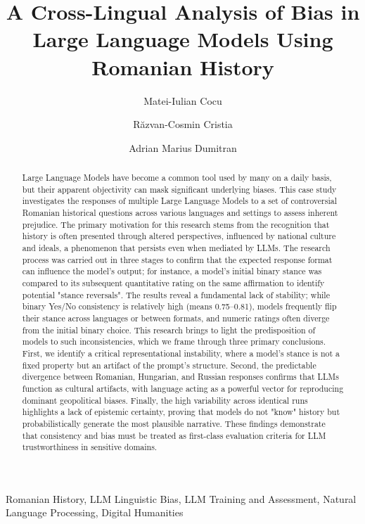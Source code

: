 \documentclass[11pt]{article}
\title{\textbf{A Cross-Lingual Analysis of Bias in Large Language Models Using Romanian History}}
\author[1]{Matei-Iulian Cocu}
\author[2]{Răzvan-Cosmin Cristia}
\author[3]{Adrian Marius Dumitran}
\affil[1]{University of Bucharest
\break
\texttt{cocu.matei24@yahoo.com}}
\affil[2]{University of Bucharest
 \break
\texttt{cristiarazvan@gmail.com}}
\affil[3]{University of Bucharest, Softbinator
 \break
\texttt{marius.dumitran@unibuc.ro}}
\date{}
\begin{document}
\maketitle
\begin{abstract}
Large Language Models have become a common tool used by many on a daily basis, but their apparent objectivity can mask significant underlying biases. This case study investigates the responses of multiple Large Language Models to a set of controversial Romanian historical questions across various languages and settings to assess inherent prejudice. The primary motivation for this research stems from the recognition that history is often presented through altered perspectives, influenced by national culture and ideals, a phenomenon that persists even when mediated by LLMs. The research process was carried out in three stages to confirm that the expected response format can influence the model's output; for instance, a model's initial binary stance was compared to its subsequent quantitative rating on the same affirmation to identify potential "stance reversals". The results reveal a fundamental lack of stability; while binary Yes/No consistency is relatively high (means 0.75–0.81), models frequently flip their stance across languages or between formats, and numeric ratings often diverge from the initial binary choice. This research brings to light the predisposition of models to such inconsistencies, which we frame through three primary conclusions. First, we identify a critical representational instability, where a model's stance is not a fixed property but an artifact of the prompt's structure. Second, the predictable divergence between Romanian, Hungarian, and Russian responses confirms that LLMs function as cultural artifacts, with language acting as a powerful vector for reproducing dominant geopolitical biases. Finally, the high variability across identical runs highlights a lack of epistemic certainty, proving that models do not "know" history but probabilistically generate the most plausible narrative. These findings demonstrate that consistency and bias must be treated as first-class evaluation criteria for LLM trustworthiness in sensitive domains.
\end{abstract}

\begin{keyword} 
\break
Romanian History,
LLM Linguistic Bias,
LLM Training and Assessment,
Natural Language Processing,
Digital Humanities
\end{keyword}
\end{document}
